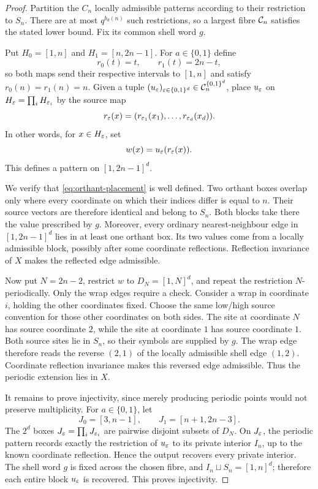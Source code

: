 \begin{proof}
Partition the $C_n$ locally admissible patterns according to their
restriction to $S_n$.  There are at most $q^{b_d(n)}$ such restrictions, so
a largest fibre $\mathcal C_n$ satisfies the stated lower bound.  Fix its common
shell word $g$.

Put $H_0=[1,n]$ and $H_1=[n,2n-1]$.  For $a\in\{0,1\}$ define
\[
 r_0(t)=t,\qquad r_1(t)=2n-t,
\]
so both maps send their respective intervals to $[1,n]$ and satisfy
$r_0(n)=r_1(n)=n$.  Given a tuple
$(u_\varepsilon)_{\varepsilon\in\{0,1\}^d}\in\mathcal C_n^{\{0,1\}^d}$, place $u_\varepsilon$ on
$H_\varepsilon=\prod_iH_{\varepsilon_i}$ by the source map
\[
 r_\varepsilon(x)=(r_{\varepsilon_1}(x_1),\ldots,r_{\varepsilon_d}(x_d)).
\]
In other words, for $x\in H_\varepsilon$, set
\begin{equation}
 w(x)=u_\varepsilon(r_\varepsilon(x)).
 \label{eq:orthant-placement}
\end{equation}
This defines a pattern on $[1,2n-1]^d$.

We verify that \cref{eq:orthant-placement} is well defined.  Two orthant
boxes overlap only where every coordinate on which their indices differ is
equal to $n$.  Their source vectors are therefore identical and belong to
$S_n$.  Both blocks take there the value prescribed by $g$.  Moreover, every
ordinary nearest-neighbour edge in $[1,2n-1]^d$ lies in at least one orthant
box.  Its two values come from a locally admissible block, possibly after
some coordinate reflections.  Reflection invariance of $X$ makes the
reflected edge admissible.

Now put $N=2n-2$, restrict $w$ to $D_N=[1,N]^d$, and repeat the restriction
$N$-periodically.  Only the wrap edges require a check.  Consider a wrap in
coordinate $i$, holding the other coordinates fixed.  Choose the same
low/high source convention for those other coordinates on both sides.  The
site at coordinate $N$ has source coordinate $2$, while the site at
coordinate $1$ has source coordinate $1$.  Both source sites lie in $S_n$,
so their symbols are supplied by $g$.  The wrap edge therefore reads the
reverse $(2,1)$ of the locally admissible shell edge $(1,2)$.  Coordinate
reflection invariance makes this reversed edge admissible.  Thus the
periodic extension lies in $X$.

It remains to prove injectivity, since merely producing periodic points would
not preserve multiplicity.  For $a\in\{0,1\}$, let
\[
 J_0=[3,n-1],\qquad J_1=[n+1,2n-3].
\]
The $2^d$ boxes $J_\varepsilon=\prod_iJ_{\varepsilon_i}$ are pairwise disjoint subsets of
$D_N$.  On $J_\varepsilon$, the periodic pattern records exactly the restriction of
$u_\varepsilon$ to its private interior $I_n$, up to the known coordinate
reflection.  Hence the output recovers every private interior.  The shell
word $g$ is fixed across the chosen fibre, and $I_n\sqcup S_n=[1,n]^d$;
therefore each entire block $u_\varepsilon$ is recovered.  This proves injectivity.
\end{proof}

